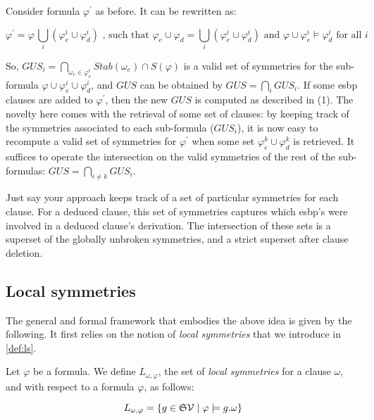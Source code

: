 
Consider formula $\varphi^\prime$ as before. It can be rewritten as:

$$\varphi^\prime=\varphi \, \underset{i}{\bigcup}(\varphi_e^i \cup \varphi_d^i) \text{ , such that } \varphi_e \cup \varphi_d = \underset{i}{\bigcup}(\varphi_e^i \cup \varphi_d^i) \text{ and } \varphi \cup \varphi_e^i \models \varphi_d^i  \text{ for all } i$$


  So, $GUS_i = \underset{\omega_e \in \varphi_e^i}{\bigcap}Stab(\omega_e) \cap S(\varphi)$ is a valid set of symmetries for the sub-formula $\varphi \cup \varphi_e^i \cup \varphi_d^i$, and $GUS$ can be obtained by $GUS = \underset{i}{\bigcap} GUS_i$. If some esbp clauses are added to $\varphi^\prime$, then the new $GUS$ is computed as described in (1). The novelty here comes with the retrieval of some set of clauses: by keeping track of the symmetries associated to each sub-formula ($GUS_i$), it is now easy to recompute a valid set of symmetries for $\varphi^\prime$ when some set
$\varphi_e^k \cup \varphi_d^k$ is retrieved. It suffices to operate the intersection on the valid symmetries of the rest of the sub-formulas: $GUS = \underset{i \neq k}{\bigcap} GUS_i$.

Just say your approach keeps track of a set of particular symmetries for each clause. For a deduced clause, this set of symmetries captures which esbp's were involved in a deduced clause's derivation. The intersection of these sets is a superset of the globally unbroken symmetries, and a strict superset after clause deletion.


\subsection{Local symmetries}

The general and formal framework that embodies the above idea is given by the following. It first relies on the notion of \textit{local symmetries} that we introduce in \cref{def:ls}.

\begin{definition}
	\label{def:ls}
	Let $\varphi$ be a formula. We define $L_{\omega,\varphi}$, 
	the set of \textit{local symmetries} for a clause $\omega$, and with respect to 
	a formula $\varphi$, as follows:
	
	$$L_{\omega,\varphi}=\{g \in \mathfrak{S}{\mathcal{V}}\mid \varphi \models g.\omega\}$$
\end{definition}

